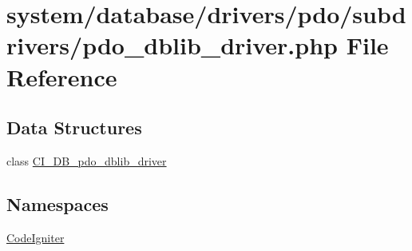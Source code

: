 \hypertarget{pdo__dblib__driver_8php}{}\section{system/database/drivers/pdo/subdrivers/pdo\+\_\+dblib\+\_\+driver.php File Reference}
\label{pdo__dblib__driver_8php}
\subsection*{Data Structures}
\begin{DoxyCompactItemize}
\item 
class \mbox{\hyperlink{class_c_i___d_b__pdo__dblib__driver}{C\+I\+\_\+\+D\+B\+\_\+pdo\+\_\+dblib\+\_\+driver}}
\end{DoxyCompactItemize}
\subsection*{Namespaces}
\begin{DoxyCompactItemize}
\item 
 \mbox{\hyperlink{namespace_code_igniter}{Code\+Igniter}}
\end{DoxyCompactItemize}
